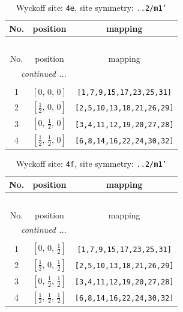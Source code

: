 \documentclass[fleqn,8pt]{jsarticle}
\begin{document}
\begin{longtable}{ccc}
\caption{Wyckoff site: {\tt 4e}, site symmetry: {\tt ..2/m1'}}
 \\
 \hline \hline
No. & position & mapping \\ \hline \endfirsthead

\multicolumn{2}{l}{\tablename\ \thetable{}} \\
 \hline \hline
No. & position & mapping \\ \hline \endhead

 \hline \hline
\multicolumn{2}{r}{\footnotesize\it continued ...} \\ \endfoot

 \hline \hline
\multicolumn{2}{r}{} \\ \endlastfoot

1 & $\left[ 0,\, 0,\, 0 \right]$ & {\tt [1,7,9,15,17,23,25,31]} \\ \hline
2 & $\left[ \frac{1}{2},\, 0,\, 0 \right]$ & {\tt [2,5,10,13,18,21,26,29]} \\ \hline
3 & $\left[ 0,\, \frac{1}{2},\, 0 \right]$ & {\tt [3,4,11,12,19,20,27,28]} \\ \hline
4 & $\left[ \frac{1}{2},\, \frac{1}{2},\, 0 \right]$ & {\tt [6,8,14,16,22,24,30,32]} \\
\end{longtable}
\renewcommand{\arraystretch}{1.2}
\begin{longtable}{ccc}
\caption{Wyckoff site: {\tt 4f}, site symmetry: {\tt ..2/m1'}}
 \\
 \hline \hline
No. & position & mapping \\ \hline \endfirsthead

\multicolumn{2}{l}{\tablename\ \thetable{}} \\
 \hline \hline
No. & position & mapping \\ \hline \endhead

 \hline \hline
\multicolumn{2}{r}{\footnotesize\it continued ...} \\ \endfoot

 \hline \hline
\multicolumn{2}{r}{} \\ \endlastfoot

1 & $\left[ 0,\, 0,\, \frac{1}{2} \right]$ & {\tt [1,7,9,15,17,23,25,31]} \\ \hline
2 & $\left[ \frac{1}{2},\, 0,\, \frac{1}{2} \right]$ & {\tt [2,5,10,13,18,21,26,29]} \\ \hline
3 & $\left[ 0,\, \frac{1}{2},\, \frac{1}{2} \right]$ & {\tt [3,4,11,12,19,20,27,28]} \\ \hline
4 & $\left[ \frac{1}{2},\, \frac{1}{2},\, \frac{1}{2} \right]$ & {\tt [6,8,14,16,22,24,30,32]} \\
\end{longtable}
\end{document}
